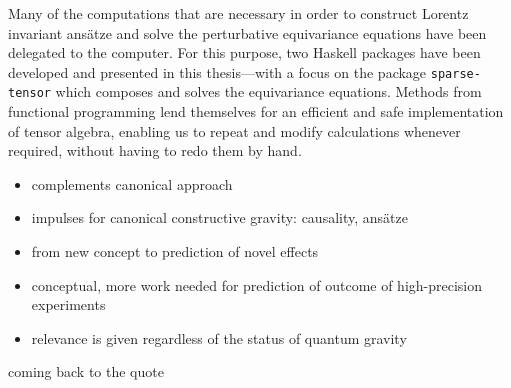 Many of the computations that are necessary in order to construct Lorentz invariant ansätze and solve the perturbative equivariance equations have been delegated to the computer. For this purpose, two Haskell packages have been developed and presented in this thesis---with a focus on the package \texttt{sparse-tensor} which composes and solves the equivariance equations. Methods from functional programming lend themselves for an efficient and safe implementation of tensor algebra, enabling us to repeat and modify calculations whenever required, without having to redo them by hand.

\begin{itemize}
\item complements canonical approach
\item impulses for canonical constructive gravity: causality, ansätze
\item from new concept to prediction of novel effects
\item conceptual, more work needed for prediction of outcome of high-precision experiments
\item relevance is given regardless of the status of quantum gravity
\end{itemize}

coming back to the quote
